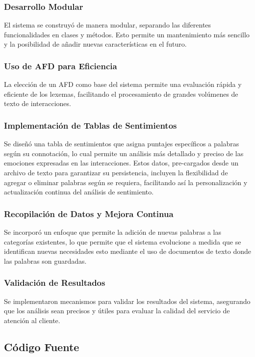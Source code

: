 \documentclass[12pt,a4paper]{article}
\begin{document}
\subsubsection{Desarrollo Modular}
El sistema se construyó de manera modular, separando las diferentes funcionalidades en clases y
métodos. Esto permite un mantenimiento más sencillo y la posibilidad de añadir nuevas
características en el futuro.

\subsubsection{Uso de AFD para Eficiencia}
La elección de un AFD como base del sistema permite una evaluación rápida y eficiente de los
lexemas, facilitando el procesamiento de grandes volúmenes de texto de interacciones.

\subsubsection{Implementación de Tablas de Sentimientos}
Se diseñó una tabla de sentimientos que asigna puntajes específicos a palabras según su
connotación, lo cual permite un análisis más detallado y preciso de las emociones expresadas en
las interacciones. Estos datos, pre-cargados desde un archivo de texto para garantizar su
persistencia, incluyen la flexibilidad de agregar o eliminar palabras según se requiera,
facilitando así la personalización y actualización continua del análisis de sentimiento.

\subsubsection{Recopilación de Datos y Mejora Continua}
Se incorporó un enfoque que permite la adición de nuevas palabras a las categorías existentes,
lo que permite que el sistema evolucione a medida que se identifican nuevas necesidades esto
mediante el uso de documentos de texto donde las palabras son guardadas.

\subsubsection{Validación de Resultados}
Se implementaron mecanismos para validar los resultados del sistema, asegurando que los
análisis sean precisos y útiles para evaluar la calidad del servicio de atención al cliente.

\newpage
\subsection{Código Fuente}
\end{document}
